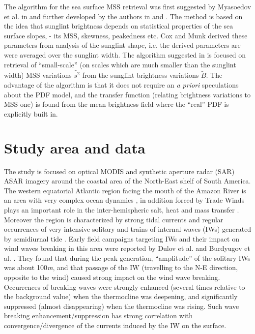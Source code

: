 \documentclass{report}
\begin{document}
The algorithm for the sea surface MSS retrieval was first suggested by Myasoedov et al. in \cite{Myasoedov2010a} and further developed by the authors in \citep{Kudryavtsev2012a} and \citep{Kudryavtsev2012b}. The method is based on the idea that sunglint brightness depends on statistical properties of the sea surface slopes, - its MSS, skewness, peakedness etc. Cox and Munk \cite{Cox1954} derived these parameters from analysis of the sunglint shape, i.e. the derived parameters are were averaged over the sunglint width. The algorithm suggested in \citep{Kudryavtsev2012a} is focused on retrieval of ``small-scale'' (on scales which are much smaller than the sunglint width) MSS variations $\tilde{s^2}$ from the sunglint brightness variations $\tilde{B}$. The advantage of the algorithm is that it does not require an \textit{a priori} speculations about the PDF model, and the transfer function (relating brightness variations to MSS one) is found from the mean brightness field where the ``real'' PDF is explicitly built in.


\section{Study area and data}

The study is focused on optical MODIS and synthetic aperture radar (SAR) ASAR imagery around the coastal area of the North-East shelf of South America. The western equatorial Atlantic region facing the mouth of the Amazon River is an area with very complex ocean dynamics \citep{Silva2010}, in addition forced by Trade Winds \citep{Augustinus2004} plays an important role in the inter-hemispheric salt, heat and mass transfer \citep{Dengler2004, Schmitz1993}. Moreover the region is characterized by strong tidal currents \citep{Oltman1968, RockwellGeyer1996, LeBars2010} and regular occurrences of very intensive solitary and trains of internal waves (IWs) generated by semidiurnal tide \citep{Burdyugov1987, Ivanov1993}. Early field campaigns targeting IWs and their impact on wind waves breaking in this area were reported by Dulov et al. \cite{Dulov1986}  and Burdyugov et al. \cite{Burdyugov1987}. They found that during the peak generation, ``amplitude'' of the solitary IWs was about 100\textit{m}, and that passage of the IW (travelling to the N-E direction, opposite to the wind) caused strong impact on the wind wave breaking.  Occurrences of breaking waves were strongly enhanced (several times relative to the background value) when the thermocline was deepening, and significantly suppressed (almost disappearing) when the thermocline was rising. Such wave breaking enhancement/suppression has strong correlation with convergence/divergence of the currents induced by the IW on the surface.
\end{document}
